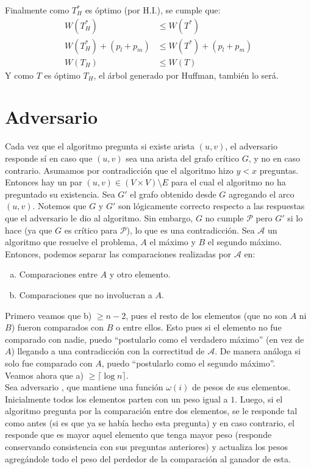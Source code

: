 \documentclass[dcc,uchile]{fcfmcourse}
\theoremstyle{plain}
\theoremstyle{definition}
\begin{document}
\begin{problems}
\begin{enumerate}[a)]
    Finalmente como $T_H^*$ es óptimo (por H.I.), se cumple que:
    \begin{align*}
        W(T_H^*) &\le W(T^*) \\
        W(T_H^*) + (p_{l}+p_{m}) &\le W(T^*) + (p_{l}+p_{m})\\
        W(T_H) &\le W(T)
    \end{align*}
    Y como $T$ es óptimo $T_H$, el árbol generado por Huffman, también lo será.
\end{enumerate}
\section*{Adversario}
\problem Cada vez que el algoritmo pregunta si existe arista $(u,v)$, el adversario responde sí en caso que $(u,v)$ sea una arista del grafo crítico $G$, y no en caso contrario. Asumamos por contradicción que el algoritmo hizo $y < x$ preguntas. Entonces hay un par $(u,v)\in (V\times V)\setminus E$ para el cual el algoritmo no ha preguntado su existencia. Sea $G'$ el grafo obtenido desde $G$ agregando el arco $(u,v)$. Notemos que $G$ y $G'$ son lógicamente correcto respecto a las respuestas que el adversario le dio al algoritmo. Sin embargo, $G$ no cumple $\mathcal{P}$ pero $G'$ si lo hace (ya que $G$ es crítico para $\mathcal{P}$), lo que es una contradicción.
\problem Sea $\mathcal{A}$ un algoritmo que resuelve el problema, $A$ el máximo y $B$ el segundo máximo. Entonces, podemos separar las comparaciones realizadas por $\mathcal{A}$ en:
\begin{enumerate}[a)]
    \item Comparaciones entre $A$ y otro elemento.
    \item Comparaciones que no involucran a $A$.
\end{enumerate}
Primero veamos que b) $\ge n-2$, pues el resto de los elementos (que no son $A$ ni $B$) fueron comparados con $B$ o entre ellos. Esto pues si el elemento no fue comparado con nadie, puedo ``postularlo como el verdadero máximo'' (en vez de $A$) llegando a una contradicción con la correctitud de $\mathcal{A}$. De manera análoga si solo fue comparado con $A$, puedo ``postularlo como el segundo máximo''.\\

Veamos ahora que a) $\ge \lceil \log{n} \rceil$.\\
Sea adversario \demon, que mantiene una función $\omega(i)$ de pesos de sus elementos.\\
Inicialmente todos los elementos parten con un peso igual a $1$. Luego, si el algoritmo pregunta por la comparación entre dos elementos, se le responde tal como antes (si es que ya se había hecho esta pregunta) y en caso contrario, el \demon responde que es mayor aquel elemento que tenga mayor peso (responde conservando consistencia con sus preguntas anteriores) y actualiza los pesos agregándole todo el peso del perdedor de la comparación al ganador de esta.\\


\end{problems}
\end{document}
